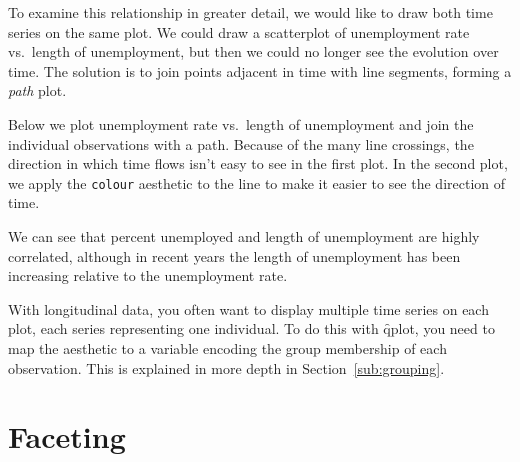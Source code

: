 % 


To examine this relationship in greater detail, we would like to draw both time series on the same plot. We could draw a scatterplot of unemployment rate vs.\ length of unemployment, but then we could no longer see the evolution over time. The solution is to join points adjacent in time with line segments, forming a \emph{path} plot.

Below we plot unemployment rate vs.\ length of unemployment and join the individual observations with a path. Because of the many line crossings, the direction in which time flows isn't easy to see in the first plot. In the second plot, we apply the {\tt colour} aesthetic to the line to make it easier to see the direction of time.

% 


We can see that percent unemployed and length of unemployment are highly correlated, although in recent years the length of unemployment has been increasing relative to the unemployment rate.

With longitudinal data, you often want to display multiple time series on each plot, each series representing one individual.  To do this with \f{qplot}, you need to map the  aesthetic to a variable encoding the group membership of each observation. This is explained in more depth in Section~\ref{sub:grouping}.  

\section{Faceting}\label{sec:qplot-faceting}

